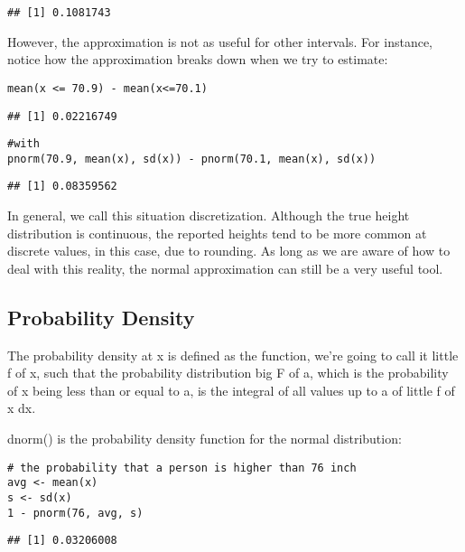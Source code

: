 \documentclass[
]{article}
\begin{document}
\begin{verbatim}
## [1] 0.1081743
\end{verbatim}

However, the approximation is not as useful for other intervals. For
instance, notice how the approximation breaks down when we try to
estimate:

\begin{verbatim}
mean(x <= 70.9) - mean(x<=70.1)
\end{verbatim}

\begin{verbatim}
## [1] 0.02216749
\end{verbatim}

\begin{verbatim}
#with
pnorm(70.9, mean(x), sd(x)) - pnorm(70.1, mean(x), sd(x))
\end{verbatim}

\begin{verbatim}
## [1] 0.08359562
\end{verbatim}

In general, we call this situation discretization. Although the true
height distribution is continuous, the reported heights tend to be more
common at discrete values, in this case, due to rounding. As long as we
are aware of how to deal with this reality, the normal approximation can
still be a very useful tool.

\hypertarget{probability-density}{%
\subsection{Probability Density}\label{probability-density}}

The probability density at x is defined as the function, we're going to
call it little f of x, such that the probability distribution big F of
a, which is the probability of x being less than or equal to a, is the
integral of all values up to a of little f of x dx.

dnorm() is the probability density function for the normal distribution:

\begin{verbatim}
# the probability that a person is higher than 76 inch
avg <- mean(x)
s <- sd(x)
1 - pnorm(76, avg, s)
\end{verbatim}

\begin{verbatim}
## [1] 0.03206008
\end{verbatim}
\end{document}
